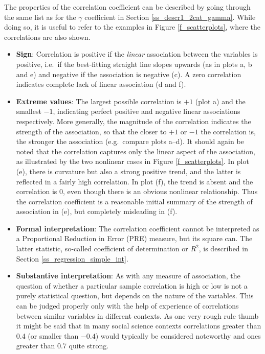 The properties of the correlation coefficient can be described by going
through the same list as for the $\gamma$ coefficient in Section
\ref{ss_descr1_2cat_gamma}. While doing so, it is useful to refer to
the examples in Figure \ref{f_scatterplots}, where the correlations are
also shown.
\begin{itemize}
\item
\textbf{Sign}: Correlation is positive if the \emph{linear} association
between the variables is positive, i.e.\ if the best-fitting straight
line slopes upwards (as in plots a, b and e) and negative if the
association is negative (c). A zero correlation indicates complete lack
of linear association (d and f).
\item
\textbf{Extreme values}: The largest possible correlation is $+1$
(plot a) and the smallest $-1$, indicating perfect positive and negative
linear associations respectively. More generally, the magnitude of the
correlation indicates the strength of the association, so that the
closer to $+1$ or $-1$ the correlation is, the stronger the association
(e.g.\ compare plots a--d). It should again be noted that the
correlation captures only the linear aspect of the association, as
illustrated by the two nonlinear cases in Figure \ref{f_scatterplots}.
In plot (e), there is curvature but also a strong positive trend, and
the latter is reflected in a fairly high correlation. In plot (f), the
trend is absent and the correlation is 0, even though there is an
obvious nonlinear relationship. Thus the correlation coefficient is a
reasonable initial summary of the strength of association in (e), but
completely misleading in (f).
\item
\textbf{Formal interpretation}: The correlation coefficient cannot be
interpreted as a Proportional Reduction in Error (PRE) measure, but its
square can. The latter statistic, so-called coefficient of determination
or $R^{2}$, is described in Section \ref{ss_regression_simple_int}.
\item
\textbf{Substantive interpretation}: As with any measure of association,
the question of whether a particular sample correlation is high
or low is not a purely statistical question, but depends on the nature
of the variables. This can be judged properly only with the help of
experience of correlations between similar variables in different
contexts. As one very rough rule thumb it might be said that in many
social science contexts correlations greater than 0.4 (or smaller than
$-0.4$) would typically be considered noteworthy and ones greater than 0.7
quite strong.
\end{itemize}

